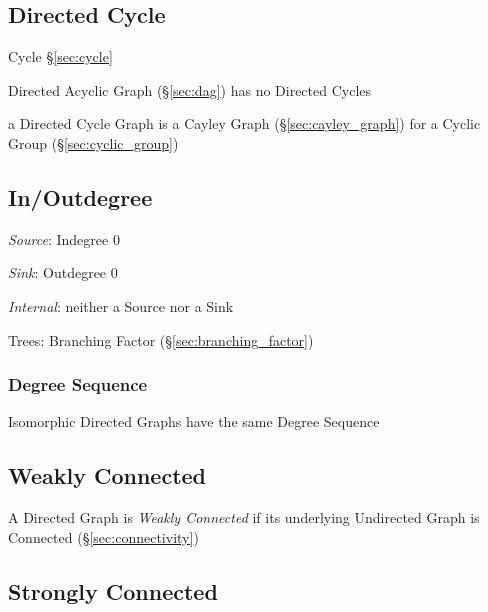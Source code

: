\subsection{Directed Cycle}\label{sec:directed_cycle}

Cycle \S\ref{sec:cycle}

Directed Acyclic Graph (\S\ref{sec:dag}) has no Directed Cycles

a Directed Cycle Graph is a Cayley Graph (\S\ref{sec:cayley_graph})
for a Cyclic Group (\S\ref{sec:cyclic_group})



\subsection{In/Outdegree}\label{sec:inoutdegree}

\emph{Source}: Indegree $0$

\emph{Sink}: Outdegree $0$

\emph{Internal}: neither a Source nor a Sink


Trees: Branching Factor (\S\ref{sec:branching_factor})



\subsubsection{Degree Sequence}\label{sec:degree_sequence}

Isomorphic Directed Graphs have the same Degree Sequence



\subsection{Weakly Connected}\label{sec:weakly_connected}

A Directed Graph is \emph{Weakly Connected} if its underlying
Undirected Graph is Connected (\S\ref{sec:connectivity})



\subsection{Strongly Connected}\label{sec:strongly_connected}

